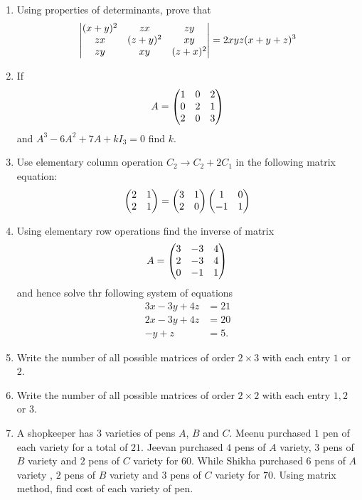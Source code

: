 \begin{enumerate}
	\item Using properties of determinants, prove that
	\begin{align*}
		\begin{vmatrix}(x + y)^2 & zx & zy \\
		zx & (z+y)^2 & xy \\
		zy & xy & (z+x)^2\end{vmatrix}
		 = 2xyz (x + y + z)^3
	\end{align*}
	
	\item If 
	\begin{align*}
		A = \begin{pmatrix}1 & 0 & 2\\
		0 & 2 & 1 \\
		2 & 0 & 3\end{pmatrix}
	\end{align*}
and $A^3-6A^2+7A+kI_3=0$ find $k$.
 \item Use elementary column operation $C_2 \rightarrow C_2 + 2C_1$ in the following matrix equation:
          \begin{align*}
              \begin{pmatrix}2 & 1 \\2&1\end{pmatrix} = \begin{pmatrix}3&1 \\ 2&0\end{pmatrix} \begin{pmatrix}1 & 0\\ -1 & 1\end{pmatrix}
          \end{align*}
    \item Using elementary row operations find the inverse of matrix
          \begin{align*}
              A =\begin{pmatrix}3 & -3 & 4 \\2&-3&4\\0&-1&1\end{pmatrix}
          \end{align*}
          and hence solve thr following system of equations
          \begin{align*}
              3x-3y+4z & =21 \\
              2x-3y+4z & =20 \\
              -y+z     & =5.
          \end{align*}
    \item Write the number of all possible matrices of order $2\times 3$ with each entry $1$ or $2$.
    \item Write the number of all possible matrices of order $2\times2$ with each entry $1,2$ or $3$.
    \item A shopkeeper has $3$ varieties of pens $A$, $B$ and $C$. Meenu purchased $1$ pen of each variety for a total of \rupee $21$. Jeevan purchased $4$ pens of $A$ variety, $3$ pens of $B$ variety and $2$ pens of $C$ variety for \rupee $60$. While Shikha purchased $6$ pens of $A$ variety , $2$ pens of $B$ variety and $3$ pens of $C$ variety for \rupee $70$. Using matrix method, find cost of each variety of pen.

\end{enumerate}
